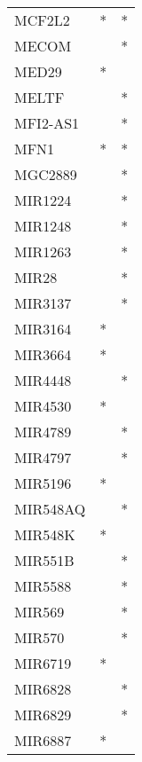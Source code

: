 \begin{longtable}{lcc}
MCF2L2           &              * &          * \\
MECOM            &                &          * \\
MED29            &              * &            \\
MELTF            &                &          * \\
MFI2-AS1         &                &          * \\
MFN1             &              * &          * \\
MGC2889          &                &          * \\
MIR1224          &                &          * \\
MIR1248          &                &          * \\
MIR1263          &                &          * \\
MIR28            &                &          * \\
MIR3137          &                &          * \\
MIR3164          &              * &            \\
MIR3664          &              * &            \\
MIR4448          &                &          * \\
MIR4530          &              * &            \\
MIR4789          &                &          * \\
MIR4797          &                &          * \\
MIR5196          &              * &            \\
MIR548AQ         &                &          * \\
MIR548K          &              * &            \\
MIR551B          &                &          * \\
MIR5588          &                &          * \\
MIR569           &                &          * \\
MIR570           &                &          * \\
MIR6719          &              * &            \\
MIR6828          &                &          * \\
MIR6829          &                &          * \\
MIR6887          &              * &            \\

\end{longtable}
